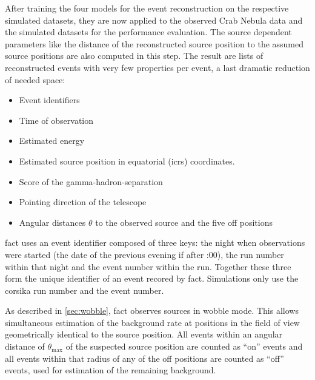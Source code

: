 \noindent After training the four models for the event reconstruction on the respective
simulated datasets, they are now applied to the observed Crab Nebula data
and the simulated datasets for the performance evaluation.
The source dependent parameters like the distance of the reconstructed source
position to the assumed source positions are also computed in this step.
The result are lists of reconstructed events with very few properties
per event, a last dramatic reduction of needed space:
\begin{itemize}[nosep]
  \item Event identifiers
  \item Time of observation
  \item Estimated energy
  \item Estimated source position in equatorial (\gls{icrs}) coordinates.
  \item Score of the gamma-hadron-separation
  \item Pointing direction of the telescope
  \item Angular distances $θ$ to the observed source and the five off positions
\end{itemize}
\gls{fact} uses an event identifier composed of three keys: the night when 
observations were started (the date of the previous evening if after {:00}),
the run number within that night and the event number within the run.
Together these three form the unique identifier of an event recored by \gls{fact}.
Simulations only use the corsika run number and the event number.

As described in \autoref{sec:wobble}, \gls{fact} observes sources in wobble mode.
This allows simultaneous estimation of the background rate at positions
in the field of view geometrically identical to the source position.
All events within an angular distance of $θ_{\max}$ of the suspected source position
are counted as \enquote{on} events and all events within that radius of any of
the off positions are counted as \enquote{off} events, used for estimation of the remaining background.

